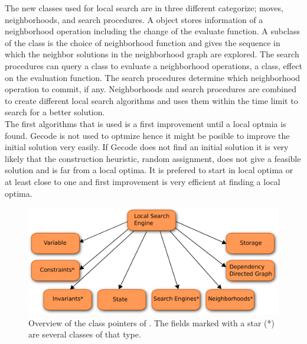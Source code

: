 The new classes used for local search are in three different categorize; moves, neighborhoods, and search 
procedures. A  object stores information of a neighborhood operation including the change of the evaluate 
function. A subclass of the  class is the choice of neighborhood function and gives the 
sequence in which the neighbor solutions in the neighborhood graph are explored. The search procedures can query a 
 class to evaluate a neighborhood operations, a  class, effect on the evaluation 
function. The search procedures determine which neighborhood operation to commit, if any. Neighborhoods and 
search 
procedures are combined to create different local search algorithms and  uses them within the 
time limit to search for a better solution. \\
The first algorithms that is used is a first improvement until a local optmia is found. Gecode is not used to optmize 
hence it might be posible to improve the initial solution very easily. If Gecode does not find an initial solution it 
is very likely that the construction heuristic, random assignment, does not give a feasible solution and is far from a 
local optima. It is prefered to start in local optima or at least close to one and first improvement is very efficient 
at finding a local optima. \\
\begin{figure}[!t]
\begin{center}
\includegraphics[width=0.9\linewidth]{LSE}\caption{Overview of the class pointers of . The 
fields marked with a star (*) are several classes of that type.} 
\label{fig_lse}
\end{center}
\end{figure}\noindent




